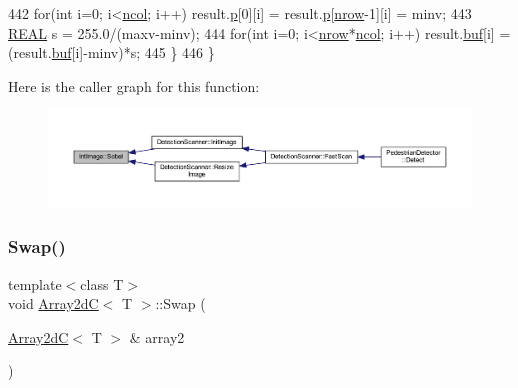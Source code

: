\begin{DoxyCode}
442         \textcolor{keywordflow}{for}(\textcolor{keywordtype}{int} i=0; i<\mbox{\hyperlink{class_array2d_c_a27e0f8f40f644831cd7c750db59dc28a}{ncol}}; i++) result.\mbox{\hyperlink{class_array2d_c_a727eae5d663d463635cc150e6f771f0d}{p}}[0][i] = result.\mbox{\hyperlink{class_array2d_c_a727eae5d663d463635cc150e6f771f0d}{p}}[\mbox{\hyperlink{class_array2d_c_a12f690f7195f7674a86a7e1eedbc473c}{nrow}}-1][i] = minv;
443         \mbox{\hyperlink{c4-pedestrian-detector_8h_a5821460e95a0800cf9f24c38915cbbde}{REAL}} s = 255.0/(maxv-minv);
444         \textcolor{keywordflow}{for}(\textcolor{keywordtype}{int} i=0; i<\mbox{\hyperlink{class_array2d_c_a12f690f7195f7674a86a7e1eedbc473c}{nrow}}*\mbox{\hyperlink{class_array2d_c_a27e0f8f40f644831cd7c750db59dc28a}{ncol}}; i++) result.\mbox{\hyperlink{class_array2d_c_a25d8fa5049d4c7ded126e0acdd18f37a}{buf}}[i] = (result.\mbox{\hyperlink{class_array2d_c_a25d8fa5049d4c7ded126e0acdd18f37a}{buf}}[i]-minv)*s;
445     \}
446 \}
\end{DoxyCode}
Here is the caller graph for this function\+:\nopagebreak
\begin{figure}[H]
\begin{center}
\leavevmode
\includegraphics[width=350pt]{class_int_image_a35b8a5c2e64fa3ab50d6b14973f368b8_icgraph}
\end{center}
\end{figure}
\mbox{\label{class_array2d_c_ae8cbeb3e4fdc3a45cc188ecc1b317919}} 
\subsubsection{\texorpdfstring{Swap()}{Swap()}\hspace{0.1cm}{\footnotesize\ttfamily [1/2]}}
{\footnotesize\ttfamily template$<$class T$>$ \\
void \mbox{\hyperlink{class_array2d_c}{Array2dC}}$<$ T $>$\+::Swap (\begin{DoxyParamCaption}\item[{\mbox{\hyperlink{class_array2d_c}{Array2dC}}$<$ T $>$ \&}]{array2 }\end{DoxyParamCaption})\hspace{0.3cm}{\ttfamily [inherited]}}



